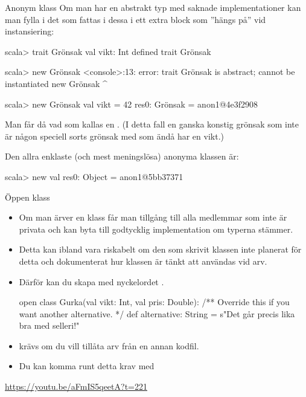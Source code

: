 \begin{Slide}{Anonym klass}\SlideFontSmall
Om man har en abstrakt typ med saknade implementationer kan man fylla i det som fattas i dessa i ett extra block som ''hängs på'' vid instansiering:
\begin{REPL}
scala> trait Grönsak { val vikt: Int }
defined trait Grönsak

scala> new Grönsak
<console>:13: error: trait Grönsak is abstract; cannot be instantiated
       new Grönsak
       ^

scala> new Grönsak { val vikt = 42 }
res0: Grönsak = anon1@4e3f2908
\end{REPL}
Man får då vad som kallas en . (I detta fall en ganska konstig grönsak som inte är någon speciell sorts grönsak med som ändå har en vikt.)

\vspace{0.5em}

Den allra enklaste (och mest meningslösa) anonyma klassen är:
\begin{REPLsmall}
scala> new {}
val res0: Object = anon1@5bb37371
\end{REPLsmall}
\end{Slide}


\begin{Slide}{Öppen klass}\SlideFontSmall
\begin{itemize}
\item Om man ärver en klass får man tillgång till alla medlemmar som inte är privata och kan byta till godtycklig implementation om typerna stämmer.
\item Detta kan ibland vara riskabelt om den som skrivit klassen inte planerat för detta och dokumenterat hur klassen är tänkt att användas vid arv. 
\item Därför kan du skapa  med nyckelordet .
\begin{Code}
open class Gurka(val vikt: Int, val pris: Double):
  /** Override this if you want another alternative. */
  def alternative: String = s"Det går precis lika bra med selleri!"  
\end{Code}
\item {} krävs om du vill tillåta arv från en annan kodfil.
\item Du kan komma runt detta krav med  
\end{itemize}  

\url{https://youtu.be/aFmIS5qeetA?t=221}
\end{Slide}


